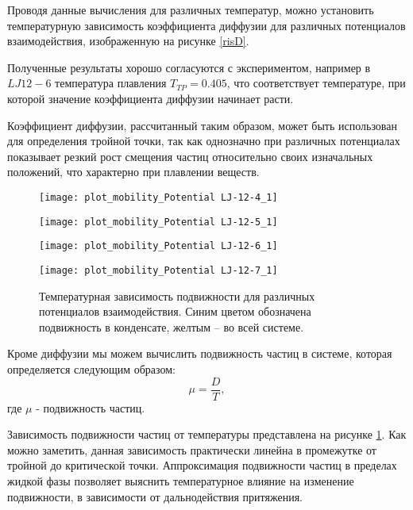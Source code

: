 Проводя данные вычисления для различных температур, можно установить температурную зависимость коэффициента диффузии для различных потенциалов взаимодействия, изображенную на рисунке \ref{risD}.

Полученные результаты хорошо согласуются с экспериментом, например в $LJ12-6$ температура плавления $T_{TP} = 0.405$, что соответствует температуре, при которой значение коэффициента диффузии начинает расти.

Коэффициент диффузии, рассчитанный таким образом, может быть использован для определения тройной точки, так как однозначно при различных потенциалах показывает резкий рост смещения частиц относительно своих изначальных положений, что характерно при плавлении веществ.

\begin{figure}[h]
\begin{center}
\begin{minipage}[h]{0.45\linewidth}
\texttt{[image: plot\_mobility\_Potential LJ-12-4\_1]}
\end{minipage}
\begin{minipage}[h]{0.45\linewidth}
\texttt{[image: plot\_mobility\_Potential LJ-12-5\_1]}
\end{minipage}
\begin{minipage}[h]{0.45\linewidth}
\texttt{[image: plot\_mobility\_Potential LJ-12-6\_1]}
\end{minipage}
\begin{minipage}[h]{0.45\linewidth}
\texttt{[image: plot\_mobility\_Potential LJ-12-7\_1]}
\end{minipage}
\caption{Температурная зависимость подвижности для различных потенциалов взаимодействия. Синим цветом обозначена подвижность в конденсате, желтым -- во всей системе.}
\label{risMuDiff}
\end{center}
\end{figure}

Кроме диффузии мы можем вычислить подвижность частиц в системе, которая определяется следующим образом:
\begin{equation}
    \mu  = \frac{D}{T},
    \label{eqMuDiff}
\end{equation}
где $\mu$ - подвижность частиц.

Зависимость подвижности частиц от температуры представлена на рисунке \ref{risMuDiff}.
Как можно заметить, данная зависимость практически линейна в промежутке от тройной до критической точки. Аппроксимация подвижности частиц в пределах жидкой фазы позволяет выяснить температурное влияние на изменение подвижности, в зависимости от дальнодействия притяжения.


